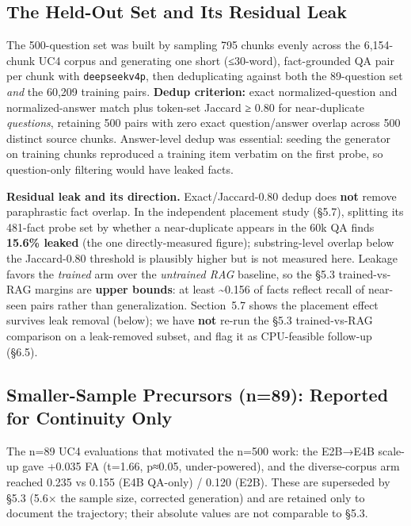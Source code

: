\hypertarget{the-held-out-set-and-its-residual-leak}{%
\subsection{The Held-Out Set and Its Residual Leak}\label{the-held-out-set-and-its-residual-leak}}

The 500-question set was built by sampling 795 chunks evenly across the 6,154-chunk UC4 corpus and generating one short (≤30-word), fact-grounded QA pair per chunk with \texttt{deepseekv4p}, then deduplicating against both the 89-question set \emph{and} the 60,209 training pairs. \textbf{Dedup criterion:} exact normalized-question and normalized-answer match plus token-set Jaccard ≥ 0.80 for near-duplicate \emph{questions}, retaining 500 pairs with zero exact question/answer overlap across 500 distinct source chunks. Answer-level dedup was essential: seeding the generator on training chunks reproduced a training item verbatim on the first probe, so question-only filtering would have leaked facts.

\textbf{Residual leak and its direction.} Exact/Jaccard-0.80 dedup does \textbf{not} remove paraphrastic fact overlap. In the independent placement study (§5.7), splitting its 481-fact probe set by whether a near-duplicate appears in the 60k QA finds \textbf{15.6\% leaked} (the one directly-measured figure); substring-level overlap below the Jaccard-0.80 threshold is plausibly higher but is not measured here. Leakage favors the \emph{trained} arm over the \emph{untrained RAG} baseline, so the §5.3 trained-vs-RAG margins are \textbf{upper bounds}: at least \textasciitilde0.156 of facts reflect recall of near-seen pairs rather than generalization. Section~5.7 shows the placement effect survives leak removal (below); we have \textbf{not} re-run the §5.3 trained-vs-RAG comparison on a leak-removed subset, and flag it as CPU-feasible follow-up (§6.5).

\hypertarget{smaller-sample-precursors-n89-reported-for-continuity-only}{%
\subsection{Smaller-Sample Precursors (n=89): Reported for Continuity Only}\label{smaller-sample-precursors-n89-reported-for-continuity-only}}

The n=89 UC4 evaluations that motivated the n=500 work: the E2B→E4B scale-up gave +0.035 FA (t=1.66, p≈0.05, under-powered), and the diverse-corpus arm reached 0.235 vs 0.155 (E4B QA-only) / 0.120 (E2B). These are superseded by §5.3 (5.6× the sample size, corrected generation) and are retained only to document the trajectory; their absolute values are not comparable to §5.3.

